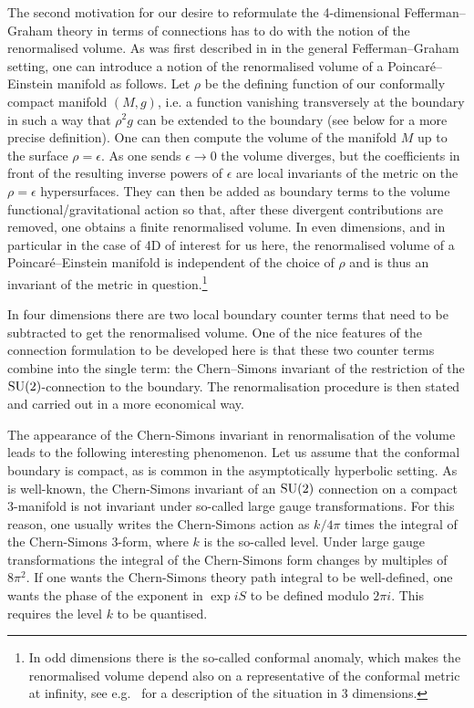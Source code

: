 \documentclass[a4paper,12pt]{article}
\begin{document}
The second motivation for our desire to reformulate the 4-dimensional Fefferman--Graham theory in terms of connections has to do with the notion of the renormalised volume. As was first described in \cite{Henningson:1998gx} in the general Fefferman--Graham setting, one can introduce a notion of the renormalised volume of a Poincar\'e--Einstein manifold as follows. Let $\rho$ be the defining function of our conformally compact manifold $(M,g)$, i.e. a function vanishing transversely at the boundary in such a way that $\rho^2 g$ can be extended to the boundary (see below for a more precise definition). One can then compute the volume of the manifold $M$ up to the surface $\rho=\epsilon$. As one sends $\epsilon\to 0$ the volume diverges, but the coefficients in front of the resulting inverse powers of $\epsilon$ are local invariants of the metric on the $\rho=\epsilon$ hypersurfaces. They can then be added as boundary terms to the volume functional/gravitational action so that, after these divergent contributions are removed, one obtains a finite renormalised volume. In even dimensions, and in particular in the case of 4D of interest for us here, the renormalised volume of a Poincar\'e--Einstein manifold is independent of the choice of $\rho$ and is thus an invariant of the metric in question.\footnote{In odd dimensions there is the so-called conformal anomaly, which makes the renormalised volume depend also on a representative of the conformal metric at infinity, see e.g.\ \cite{Krasnov:2006jb} for a description of the situation in 3 dimensions.}

In four dimensions there are two local boundary counter terms that need to be subtracted to get the renormalised volume. One of the nice features of the connection formulation to be developed here is that these two counter terms combine into the single term: the Chern--Simons invariant of the restriction of the ${\rm SU}(2)$-connection to the boundary. The renormalisation procedure is then stated and carried out in a more economical way. 

The appearance of the Chern-Simons invariant in renormalisation of the volume leads to the following interesting phenomenon. Let us assume that the conformal boundary is compact, as is common in the asymptotically hyperbolic setting. As is well-known, the Chern-Simons invariant of an ${\rm SU}(2)$ connection on a compact 3-manifold is not invariant under so-called large gauge transformations. For this reason, one usually writes the Chern-Simons action as $k/4\pi$ times the integral of the Chern-Simons 3-form, where $k$ is the so-called level. Under large gauge transformations the integral of the Chern-Simons form changes by multiples of $8\pi^2$. If one wants the Chern-Simons theory path integral to be well-defined, one wants the phase of the exponent in $\exp{i S}$ to be defined modulo $2\pi i$. This requires the level $k$ to be quantised. 
\end{document}
